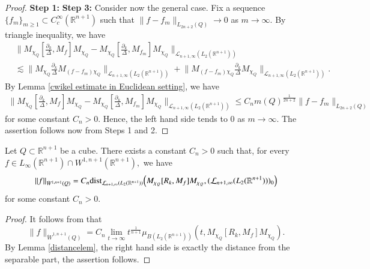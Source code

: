 \documentclass[12pt]{amsart}
\begin{document}
\begin{proof} {\bf Step 1:}
{\bf Step 3:} Consider now the general case. Fix a sequence $\{f_m\}_{m\geq1}\subset C^{\infty}_c(\mathbb{R}^{n+1})$ such that $\|f-f_m\|_{L_{2n+2}(Q)}\to0$ as $m\to\infty.$ By triangle inequality, we have
\begin{align*}
&\Big\|M_{\chi_Q}[\frac{\partial_k}{\Delta},M_f]M_{\chi_Q}-M_{\chi_Q}[\frac{\partial_k}{\Delta},M_{f_m}]M_{\chi_Q}\Big\|_{\mathcal{L}_{n+1,\infty}(L_2(\mathbb{R}^{n+1}))}\\
&\lesssim\Big\|M_{\chi_Q}\frac{\partial_k}{\Delta}M_{(f-f_m) \chi_Q}\Big\|_{\mathcal{L}_{n+1,\infty}(L_2(\mathbb{R}^{n+1}))}+\Big\|M_{(f-f_m)\chi_Q}\frac{\partial_k}{\Delta}M_{\chi_Q}\Big\|_{\mathcal{L}_{n+1,\infty}(L_2(\mathbb{R}^{n+1}))}.
\end{align*}
By Lemma \ref{cwikel estimate in Euclidean setting}, we have
\begin{align*}
\Big\|M_{\chi_Q}[\frac{\partial_k}{\Delta},M_f]M_{\chi_Q}-M_{\chi_Q}[\frac{\partial_k}{\Delta},M_{f_m}]M_{\chi_Q}\Big\|_{\mathcal{L}_{n+1,\infty}(L_2(\mathbb{R}^{n+1}))}\leq C_nm(Q)^{\frac1{2n+2}}\|f-f_m\|_{L_{2n+2}(Q)}
\end{align*}
for some constant $C_n>0$. Hence, the left hand side tends to $0$ as $m\to\infty.$ The assertion follows now from Steps 1 and 2.
\end{proof}

\begin{lemma}\label{first distance lemma} Let $Q\subset\mathbb{R}^{n+1}$ be a cube. There exists a constant $C_n>0$ such that, for every $f\in L_{\infty}(\mathbb{R}^{n+1})\cap W^{1,n+1}(\mathbb{R}^{n+1}),$ we have
$$\|f\|_{\dot{W}^{1,n+1}(Q)}=C_n{\rm dist}_{\mathcal{L}_{n+1,\infty}(L_2(\mathbb{R}^{n+1}))}\Big(M_{\chi_Q}[R_k,M_f]M_{\chi_Q},(\mathcal{L}_{n+1,\infty}(L_2(\mathbb{R}^{n+1})))_0\Big)$$
for some constant $C_n>0$.
\end{lemma}
\begin{proof}
It follows from \cite[Proposition 8.6]{FSZ} that
$$\|f\|_{\dot{W}^{1,n+1}(Q)}=C_n \lim_{t\to\infty}t^{\frac1{n+1}}\mu_{B(L_2(\mathbb{R}^{n+1}))}(t,M_{\chi_Q}[R_k,M_f]M_{\chi_Q}).$$
{\color{blue}By Lemma \ref{distancelem}, the right hand side is exactly the distance from the separable part}, the assertion follows.
\end{proof}
\end{document}

